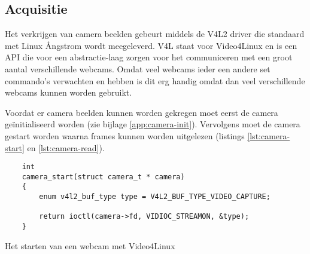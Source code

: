 \subsection{Acquisitie}

Het verkrijgen van camera beelden gebeurt middels de V4L2 driver die standaard
met Linux Ångstrom wordt meegeleverd. V4L staat voor Video4Linux en is een
API die voor een abstractie-laag zorgen voor het communiceren met een groot
aantal verschillende webcams. Omdat veel webcams ieder een andere set commando's
verwachten en hebben is dit erg handig omdat dan veel verschillende webcams
kunnen worden gebruikt.

Voordat er camera beelden kunnen worden gekregen moet eerst de camera
geïnitialiseerd worden (zie bijlage \ref{app:camera-init}). Vervolgens moet de
camera gestart worden waarna frames kunnen worden uitgelezen (listings
\ref{lst:camera-start} en \ref{lst:camera-read}).

\begin{listing}
    \begin{verbatim}
    int
    camera_start(struct camera_t * camera)
    {
        enum v4l2_buf_type type = V4L2_BUF_TYPE_VIDEO_CAPTURE;

        return ioctl(camera->fd, VIDIOC_STREAMON, &type);
    }
    \end{verbatim}
    \caption{Het starten van een webcam met Video4Linux}
    \label{lst:camera-start}
\end{listing}

